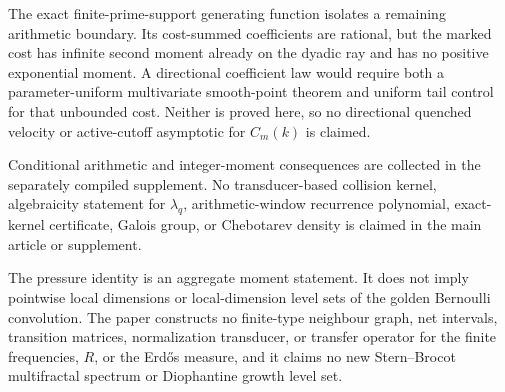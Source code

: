 The exact finite-prime-support generating function isolates a remaining
arithmetic boundary.  Its cost-summed coefficients are rational, but the
marked cost has infinite second moment already on the dyadic ray and has no
positive exponential moment.  A directional coefficient law would require
both a parameter-uniform multivariate smooth-point theorem and uniform tail
control for that unbounded cost.  Neither is proved here, so no directional
quenched velocity or active-cutoff asymptotic for \(C_m(k)\) is claimed.

Conditional arithmetic and integer-moment consequences are collected in the
separately compiled supplement.  No transducer-based collision kernel,
algebraicity statement for \(\lambda_q\), arithmetic-window recurrence
polynomial, exact-kernel certificate, Galois group, or Chebotarev density is
claimed in the main article or supplement.

The pressure identity is an aggregate moment statement.  It does not imply
pointwise local dimensions or local-dimension level sets of the golden
Bernoulli convolution.  The paper constructs no finite-type neighbour graph,
net intervals, transition matrices, normalization transducer, or transfer
operator for the finite frequencies, \(R\), or the Erd\H{o}s measure, and it
claims no new Stern--Brocot multifractal spectrum or Diophantine growth level
set.
